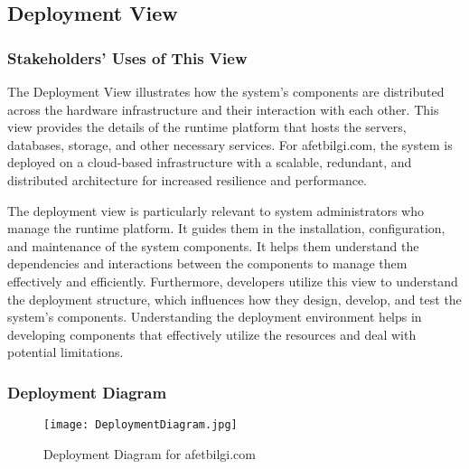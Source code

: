 \documentclass[12pt, letterpaper]{article}
\begin{document}
\newpage

\subsection{Deployment View}
\subsubsection{Stakeholders' Uses of This View}

The Deployment View illustrates how the system's components are distributed across the hardware infrastructure and their interaction with each other. This view provides the details of the runtime platform that hosts the servers, databases, storage, and other necessary services. For afetbilgi.com, the system is deployed on a cloud-based infrastructure with a scalable, redundant, and distributed architecture for increased resilience and performance.

The deployment view is particularly relevant to system administrators who manage the runtime platform. It guides them in the installation, configuration, and maintenance of the system components. It helps them understand the dependencies and interactions between the components to manage them effectively and efficiently. Furthermore, developers utilize this view to understand the deployment structure, which influences how they design, develop, and test the system's components. Understanding the deployment environment helps in developing components that effectively utilize the resources and deal with potential limitations.

\subsubsection{Deployment Diagram}

\begin{figure}[H]
\centering
\texttt{[image: DeploymentDiagram.jpg]}
\caption{Deployment Diagram for afetbilgi.com}
\end{figure}

\newpage
\end{document}

